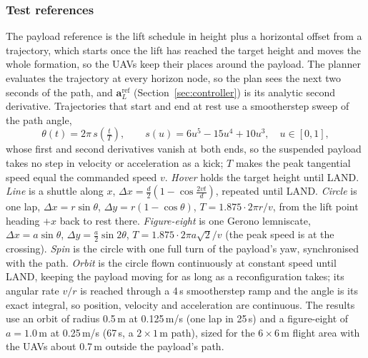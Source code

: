 
\subsubsection{Test references}
\label{sec:trajectories}

The payload reference is the lift schedule in height plus a horizontal offset from a trajectory, which
starts once the lift has reached the target height and moves the whole formation, so the UAVs keep their
places around the payload. The planner evaluates the trajectory at every horizon node, so the plan sees
the next two seconds of the path, and $\mathbf{a}_L^{\mathrm{ref}}$ (Section~\ref{sec:controller}) is its
analytic second derivative. Trajectories that start and end at rest use a smootherstep sweep of the path
angle,
\begin{equation}
    \theta(t) = 2\pi\, s\!\left(\tfrac{t}{T}\right), \qquad s(u) = 6u^5 - 15u^4 + 10u^3, \quad u \in [0,1],
\end{equation}
whose first and second derivatives vanish at both ends, so the suspended payload takes no step in
velocity or acceleration as a kick; $T$ makes the peak tangential speed equal the commanded speed $v$.
\emph{Hover} holds the target height until LAND. \emph{Line} is a shuttle along $x$,
$\Delta x = \tfrac{d}{2}\left(1 - \cos\tfrac{2vt}{d}\right)$, repeated until LAND. \emph{Circle} is one lap,
$\Delta x = r\sin\theta$, $\Delta y = r(1-\cos\theta)$, $T = 1.875 \cdot 2\pi r / v$, from the lift point
heading $+x$ back to rest there. \emph{Figure-eight} is one Gerono lemniscate, $\Delta x = a\sin\theta$,
$\Delta y = \tfrac{a}{2}\sin 2\theta$, $T = 1.875 \cdot 2\pi a\sqrt{2} / v$ (the peak speed is at the
crossing). \emph{Spin} is the circle with one full turn of the payload's yaw, synchronised with the path.
\emph{Orbit} is the circle flown continuously at constant speed until LAND, keeping the payload moving for
as long as a reconfiguration takes; its angular rate $v/r$ is reached through a 4\,s smootherstep ramp and
the angle is its exact integral, so position, velocity and acceleration are continuous. The results use
an orbit of radius 0.5\,m at 0.125\,m/s (one lap in 25\,s) and a figure-eight of $a = 1.0$\,m at
0.25\,m/s (67\,s, a $2 \times 1$\,m path), sized for the 6\,$\times$\,6\,m flight area with the UAVs about
0.7\,m outside the payload's path.
